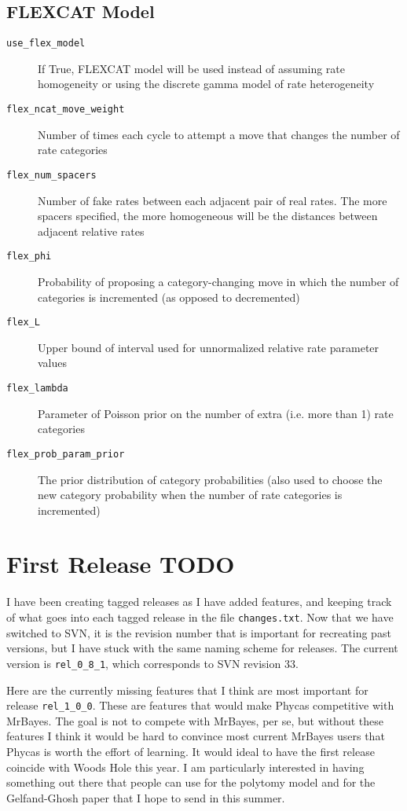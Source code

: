 \documentclass[10pt]{article}
\begin{document}
\subsection{FLEXCAT Model}
\begin{description}
\item[{\tt use\_flex\_model}] If True, FLEXCAT model will be used instead of assuming rate homogeneity or using the discrete gamma model of rate heterogeneity
\item[{\tt flex\_ncat\_move\_weight}] Number of times each cycle to attempt a move that changes the number of rate categories
\item[{\tt flex\_num\_spacers}] Number of fake rates between each adjacent pair of real rates. The more spacers specified, the more homogeneous will be the distances between adjacent relative rates
\item[{\tt flex\_phi}] Probability of proposing a category-changing move in which the number of categories is incremented (as opposed to decremented)
\item[{\tt flex\_L}] Upper bound of interval used for unnormalized relative rate parameter values
\item[{\tt flex\_lambda}] Parameter of Poisson prior on the number of extra (i.e. more than 1) rate categories
\item[{\tt flex\_prob\_param\_prior}] The prior distribution of category probabilities (also used to choose the new category probability when the number of rate categories is incremented)
\end{description}

\section{First Release TODO}

I have been creating tagged releases as I have added features, and keeping track of what goes into each tagged release in the file {\tt changes.txt}. Now that we have switched to SVN, it is the revision number that is important for recreating past versions, but I have stuck with the same naming scheme for releases. The current version is \verb+rel_0_8_1+, which corresponds to SVN revision 33.

Here are the currently missing features that I think are most important for release \verb+rel_1_0_0+. These are features that would make Phycas competitive with MrBayes. The goal is not to compete with MrBayes, per se, but without these features I think it would be hard to convince most current MrBayes users that Phycas is worth the effort of learning. It would ideal to have the first release coincide with Woods Hole this year. I am particularly interested in having something out there that people can use for the polytomy model and for the Gelfand-Ghosh paper that I hope to send in this summer.
\end{document}
